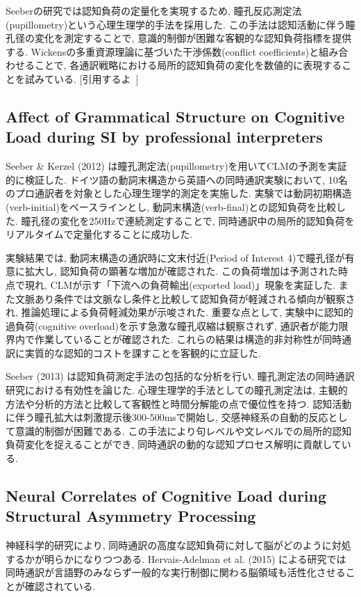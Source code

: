 Seeberの研究では認知負荷の定量化を実現するため, 瞳孔反応測定法(pupillometry)という心理生理学的手法を採用した.
この手法は認知活動に伴う瞳孔径の変化を測定することで, 意識的制御が困難な客観的な認知負荷指標を提供する.
Wickensの多重資源理論に基づいた干渉係数(conflict coefficients)と組み合わせることで, 各通訳戦略における局所的認知負荷の変化を数値的に表現することを試みている.
[引用するよ~]

\subsection{Affect of Grammatical Structure on Cognitive Load during SI by professional interpreters}

Seeber \& Kerzel (2012) \cite{seeber2012cognitive}は瞳孔測定法(pupillometry)を用いてCLMの予測を実証的に検証した.
ドイツ語の動詞末構造から英語への同時通訳実験において, 10名のプロ通訳者を対象とした心理生理学的測定を実施した.
実験では動詞初期構造(verb-initial)をベースラインとし, 動詞末構造(verb-final)との認知負荷を比較した.
瞳孔径の変化を250Hzで連続測定することで, 同時通訳中の局所的認知負荷をリアルタイムで定量化することに成功した.

実験結果では, 動詞末構造の通訳時に文末付近(Period of Interest 4)で瞳孔径が有意に拡大し, 認知負荷の顕著な増加が確認された.
この負荷増加は予測された時点で現れ, CLMが示す「下流への負荷輸出(exported load)」現象を実証した.
また文脈あり条件では文脈なし条件と比較して認知負荷が軽減される傾向が観察され, 推論処理による負荷軽減効果が示唆された.
重要な点として, 実験中に認知的過負荷(cognitive overload)を示す急激な瞳孔収縮は観察されず, 通訳者が能力限界内で作業していることが確認された.
これらの結果は構造的非対称性が同時通訳に実質的な認知的コストを課すことを客観的に立証した.

Seeber (2013) \cite{seeber2013cognitive}は認知負荷測定手法の包括的な分析を行い, 瞳孔測定法の同時通訳研究における有効性を論じた.
心理生理学的手法としての瞳孔測定法は, 主観的方法や分析的方法と比較して客観性と時間分解能の点で優位性を持つ.
認知活動に伴う瞳孔拡大は刺激提示後300-500msで開始し, 交感神経系の自動的反応として意識的制御が困難である.
この手法により句レベルや文レベルでの局所的認知負荷変化を捉えることができ, 同時通訳の動的な認知プロセス解明に貢献している.

\subsection{Neural Correlates of Cognitive Load during Structural Asymmetry Processing}
神経科学的研究により, 同時通訳の高度な認知負荷に対して脳がどのように対処するかが明らかになりつつある. 
Hervais-Adelman et al. (2015) による研究では同時通訳が言語野のみならず一般的な実行制御に関わる脳領域も活性化させることが確認されている. 

